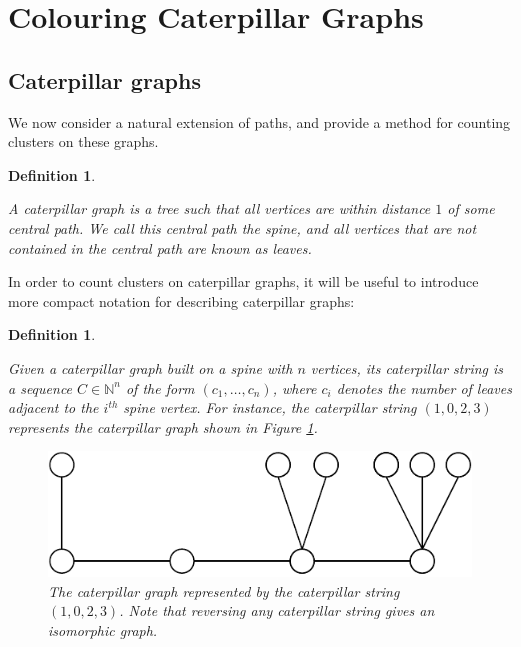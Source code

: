 \documentclass{mpaper}
\newtheorem{definition}[theorem]{Definition}
\begin{document}
\section{Colouring Caterpillar Graphs}
\vspace{1em}

\subsection{Caterpillar graphs}
\vspace{1em}

We now consider a natural extension of paths, and provide a method for counting clusters on these graphs.

\begin{definition}
  \label{def/caterpillars}

  A \emph{caterpillar graph} is a tree such that all vertices are within distance $1$ of some central path. We call this central path the \emph{spine}, and all vertices that are not contained in the central path are known as \emph{leaves}.
  
\end{definition}

In order to count clusters on caterpillar graphs, it will be useful to introduce more compact notation for describing caterpillar graphs:

\begin{definition}
  \label{def/caterpillar-strings}

  Given a caterpillar graph built on a spine with $n$ vertices, its \emph{caterpillar string} is a sequence $C \in \mathbb{N}^n$ of the form $(c_1, \dots, c_n)$, where $c_i$ denotes the number of leaves adjacent to the $i^{th}$ spine vertex. For instance, the caterpillar string $(1,0,2,3)$ represents the caterpillar graph shown in Figure \ref{fig/test-caterpillar-string}.
  
  \begin{figure}
      \centering
      \includegraphics{mpaper/figures/testCaterpillarString.pdf}
      \caption{The caterpillar graph represented by the caterpillar string $(1,0,2,3)$. Note that reversing any caterpillar string gives an isomorphic graph.}
      \label{fig/test-caterpillar-string}
  \end{figure}
  
  

\end{definition}
\end{document}
